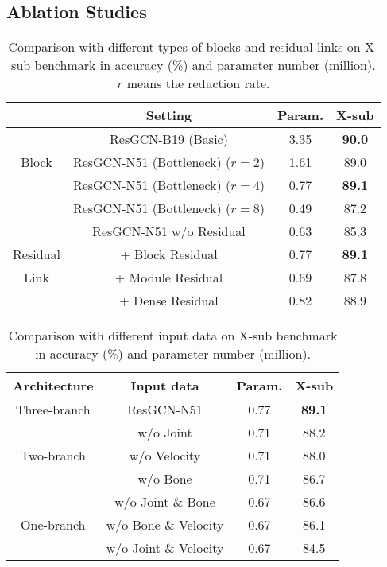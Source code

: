 \documentclass[sigconf]{acmart}
\begin{document}
\subsection{Ablation Studies}
\label{ssec:ablation}

\begin{table}
  \begin{center}
  \begin{tabular}{c|cc|c}
  \hline
  & Setting & Param. & X-sub \\
  \hline
  \hline
  & ResGCN-B19 (Basic) & 3.35 & {\bf 90.0} \\
  Block & ResGCN-N51 (Bottleneck) ($r=2$) & 1.61 & 89.0 \\
  & ResGCN-N51 (Bottleneck) ($r=4$) & 0.77 & {\bf 89.1} \\
  & ResGCN-N51 (Bottleneck) ($r=8$) & 0.49 & 87.2 \\
  \hline
  \hline
  & ResGCN-N51 w/o Residual & 0.63 & 85.3 \\
  Residual & + Block Residual & 0.77 & {\bf 89.1} \\
  Link & + Module Residual & 0.69 & 87.8 \\
  & + Dense Residual & 0.82 & 88.9 \\
  \hline
  \end{tabular}
  \end{center}
  \caption{Comparison with different types of blocks and residual links on X-sub benchmark in accuracy (\%) and parameter number (million). $r$ means the reduction rate.}\label{tab:setting}
  \vspace{-0.4cm}
\end{table}

\begin{table}
  \begin{center}
  \begin{tabular}{c|cc|c}
  \hline
  Architecture & Input data & Param. & X-sub \\
  \hline
  \hline
  Three-branch & ResGCN-N51 & 0.77 & {\bf 89.1} \\
  \hline
  & w/o Joint & 0.71 & 88.2 \\
  Two-branch & w/o Velocity & 0.71 & 88.0 \\
  & w/o Bone & 0.71 & 86.7 \\
  \hline
  & w/o Joint \& Bone & 0.67 & 86.6 \\
  One-branch & w/o Bone \& Velocity & 0.67 & 86.1 \\
  & w/o Joint \& Velocity & 0.67 & 84.5 \\
  \hline
  \end{tabular}
  \end{center}
  \caption{Comparison with different input data on X-sub benchmark in accuracy (\%) and parameter number (million).}\label{tab:input}
  \vspace{-0.4cm}
\end{table}
\end{document}
